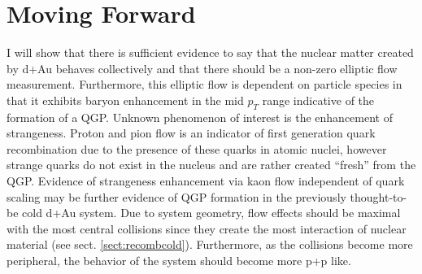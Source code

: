 \section{Moving Forward}
I will show that there is sufficient evidence to say that the nuclear matter created by d+Au behaves collectively and that there should be a non-zero elliptic flow measurement. Furthermore, this elliptic flow is dependent on particle species in that it exhibits baryon enhancement in the mid $p_T$ range indicative of the formation of a QGP. Unknown phenomenon of interest is the enhancement of strangeness. Proton and pion flow is an indicator of first generation quark recombination due to the presence of these quarks in atomic nuclei, however strange quarks do not exist in the nucleus and are rather created ``fresh'' from the QGP.  Evidence of strangeness enhancement via kaon flow independent of quark scaling may be further evidence of QGP formation in the previously thought-to-be cold d+Au system. Due to system geometry, flow effects should be maximal with the most central collisions since they create the most interaction of nuclear material (see sect. \ref{sect:recombcold}). Furthermore, as the collisions become more peripheral, the behavior of the system should become more p+p like.
\pagebreak
\pagebreak
